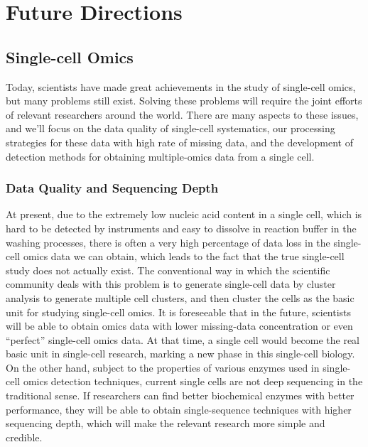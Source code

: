 \chapter{Future Directions} %

\label{Future Directions} %

\section{Single-cell Omics}

Today, scientists have made great achievements in the study of single-cell omics, but many problems still exist. Solving these problems will require the joint efforts of relevant researchers around the world. There are many aspects to these issues, and we'll focus on the data quality of single-cell systematics, our processing strategies for these data with high rate of missing data, and the development of detection methods for obtaining multiple-omics data from a single cell. 

\subsection{Data Quality and Sequencing Depth}

At present, due to the extremely low nucleic acid content in a single cell, which is hard to be detected by instruments and easy to dissolve in reaction buffer in the washing processes, there is often a very high percentage of data loss in the single-cell omics data we can obtain, which leads to the fact that the true single-cell study does not actually exist. The conventional way in which the scientific community deals with this problem is to generate single-cell data by cluster analysis to generate multiple cell clusters, and then cluster the cells as the basic unit for studying single-cell omics. It is foreseeable that in the future, scientists will be able to obtain omics data with lower missing-data concentration or even ``perfect'' single-cell omics data. At that time, a single cell would become the real basic unit in single-cell research, marking a new phase in this single-cell biology. On the other hand, subject to the properties of various enzymes used in single-cell omics detection techniques, current single cells are not deep sequencing in the traditional sense. If researchers can find better biochemical enzymes with better performance, they will be able to obtain single-sequence techniques with higher sequencing depth, which will make the relevant research more simple and credible.

